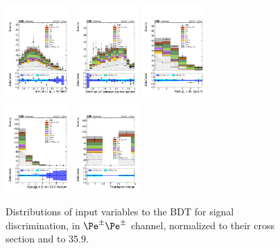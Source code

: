 \begin{figure} [!h]
  \includegraphics[width=0.22\textwidth]{figures/signalregion_2lss/ee/maxEtaJet25_40.pdf}
  \includegraphics[width=0.22\textwidth]{figures/signalregion_2lss/ee/minDRll.pdf} 
  \includegraphics[width=0.22\textwidth]{figures/signalregion_2lss/ee/nJet25.pdf} \\
  \includegraphics[width=0.22\textwidth]{figures/signalregion_2lss/ee/nJetEta1_40.pdf}
  \includegraphics[width=0.22\textwidth]{figures/signalregion_2lss/ee/totCharge.pdf}
\caption{Distributions of input variables to the BDT for signal discrimination, in $\Pe^{\pm}\Pe^{\pm}$ channel, normalized to their cross section and to 35.9\fbinv.}
\label{fig:input_vars_2lss_xsec_ee}
\end{figure}

